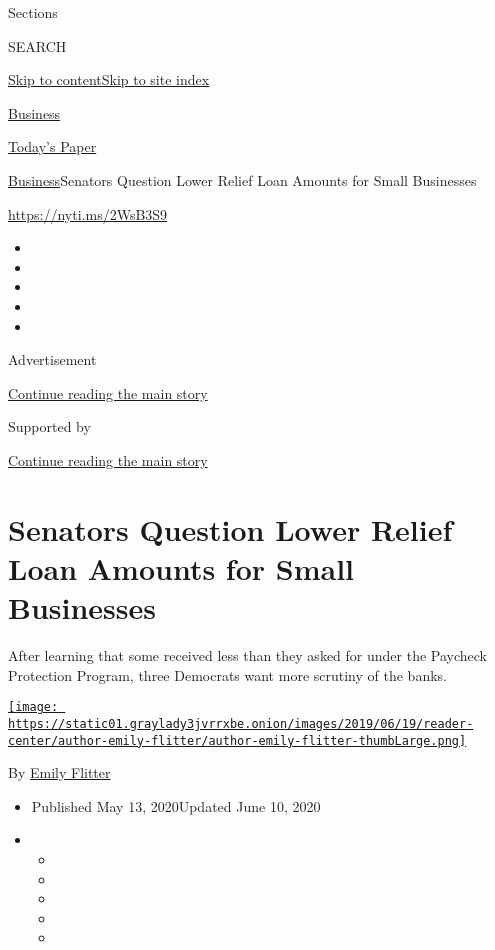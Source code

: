 Sections

SEARCH

\protect\hyperlink{site-content}{Skip to
content}\protect\hyperlink{site-index}{Skip to site index}

\href{https://www.nytimes3xbfgragh.onion/section/business}{Business}

\href{https://myaccount.nytimes3xbfgragh.onion/auth/login?response_type=cookie\&client_id=vi}{}

\href{https://www.nytimes3xbfgragh.onion/section/todayspaper}{Today's
Paper}

\href{/section/business}{Business}\textbar{}Senators Question Lower
Relief Loan Amounts for Small Businesses

\url{https://nyti.ms/2WsB3S9}

\begin{itemize}
\item
\item
\item
\item
\item
\end{itemize}

Advertisement

\protect\hyperlink{after-top}{Continue reading the main story}

Supported by

\protect\hyperlink{after-sponsor}{Continue reading the main story}

\hypertarget{senators-question-lower-relief-loan-amounts-for-small-businesses}{%
\section{Senators Question Lower Relief Loan Amounts for Small
Businesses}\label{senators-question-lower-relief-loan-amounts-for-small-businesses}}

After learning that some received less than they asked for under the
Paycheck Protection Program, three Democrats want more scrutiny of the
banks.

\href{https://www.nytimes3xbfgragh.onion/by/emily-flitter}{\texttt{[image: https://static01.graylady3jvrrxbe.onion/images/2019/06/19/reader-center/author-emily-flitter/author-emily-flitter-thumbLarge.png]}}

By \href{https://www.nytimes3xbfgragh.onion/by/emily-flitter}{Emily
Flitter}

\begin{itemize}
\item
  Published May 13, 2020Updated June 10, 2020
\item
  \begin{itemize}
  \item
  \item
  \item
  \item
  \item
  \end{itemize}
\end{itemize}

